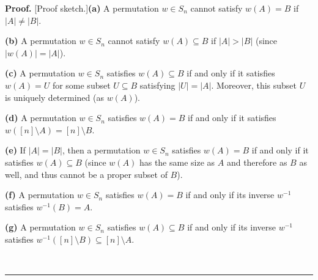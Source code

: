 \documentclass[numbers=enddot,12pt,final,onecolumn,notitlepage]{scrartcl}%
\numberwithin{exer}{subsection}
\theoremstyle{definition}
\newenvironment{proof}[1][Proof]{\noindent\textbf{#1.} }{\ \rule{0.5em}{0.5em}}
\begin{document}
\begin{proof}
[Proof sketch.]\textbf{(a)} A permutation $w\in S_{n}$ cannot satisfy
$w\left(  A\right)  =B$ if $\left\vert A\right\vert \neq\left\vert
B\right\vert $. \medskip

\textbf{(b)} A permutation $w\in S_{n}$ cannot satisfy $w\left(  A\right)
\subseteq B$ if $\left\vert A\right\vert >\left\vert B\right\vert $ (since
$\left\vert w\left(  A\right)  \right\vert =\left\vert A\right\vert $).
\medskip

\textbf{(c)} A permutation $w\in S_{n}$ satisfies $w\left(  A\right)
\subseteq B$ if and only if it satisfies $w\left(  A\right)  =U$ for some
subset $U\subseteq B$ satisfying $\left\vert U\right\vert =\left\vert
A\right\vert $. Moreover, this subset $U$ is uniquely determined (as $w\left(
A\right)  $). \medskip

\textbf{(d)} A permutation $w\in S_{n}$ satisfies $w\left(  A\right)  =B$ if
and only if it satisfies $w\left(  \left[  n\right]  \setminus A\right)
=\left[  n\right]  \setminus B$. \medskip

\textbf{(e)} If $\left\vert A\right\vert =\left\vert B\right\vert $, then a
permutation $w\in S_{n}$ satisfies $w\left(  A\right)  =B$ if and only if it
satisfies $w\left(  A\right)  \subseteq B$ (since $w\left(  A\right)  $ has
the same size as $A$ and therefore as $B$ as well, and thus cannot be a proper
subset of $B$). \medskip

\textbf{(f)} A permutation $w\in S_{n}$ satisfies $w\left(  A\right)  =B$ if
and only if its inverse $w^{-1}$ satisfies $w^{-1}\left(  B\right)  =A$.
\medskip

\textbf{(g)} A permutation $w\in S_{n}$ satisfies $w\left(  A\right)
\subseteq B$ if and only if its inverse $w^{-1}$ satisfies $w^{-1}\left(
\left[  n\right]  \setminus B\right)  \subseteq\left[  n\right]  \setminus A$.
\medskip


\end{proof}
\end{document}
